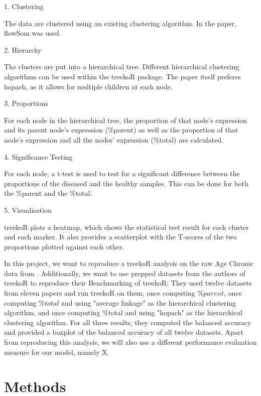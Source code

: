 \documentclass[11pt,a4paper,twoside]{report}\usepackage[]{graphicx}\usepackage[]{color}
\begin{document}
1. Clustering

The data are clustered using an existing clustering algorithm. In the paper, flowSom was used. 

2. Hierarchy

The clusters are put into a hierarchical tree. Different hierarchical clustering algorithms can be used within the treekoR package. The paper itself preferes hopach, as it allows for multiple children at each node.

3. Proportions

For each node in the hierarchical tree, the proportion of that node's expression and its parent node's expression ($\%$parent) as well as the proportion of that node's expression and all the nodes' expression ($\%$total) are calculated.

4. Significance Testing

For each node, a t-test is used to test for a significant difference between the proportions of the diseased and the healthy samples. This can be done for both the $\%$parent and the $\%$total.

5. Visualisation

treekoR plots a heatmap, which shows the statistical test result for each cluster and each marker. It also provides a scatterplot with the T-scores of the two proportions plotted against each other.

In this project, we want to reproduce a treekoR analysis on the raw Age Chronic data from \citet{Shen:16}.
Additionally, we want to use prepped datasets from the authors of treekoR to reproduce their Benchmarking of treekoR: They used twelve datasets from eleven papers and run treekoR on them, once computing $\%parent$, once computing $\%total$ and using "average linkage" as the hierarchical clustering algorithm, and once computing $\%$total and using "hopach" as the hierarchical clustering algorithm. For all three results, they computed the balanced accuracy and provided a boxplot of the balanced accuracy of all twelve datasets. Apart from reproducing this analysis, we will also use a different performance evaluation measure for our model, namely X. 




\chapter{Methods} 
\end{document}
